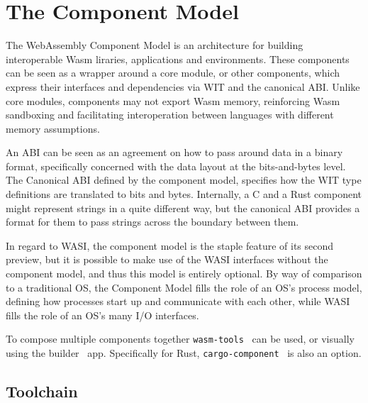 \section{The Component Model}
\label{chap:component_model}


The WebAssembly Component Model is an architecture for building interoperable \gls{Wasm} liraries, applications and environments. These components can be seen as a wrapper around a core module, or other components, which express their interfaces and dependencies via \gls{WIT} and the canonical \gls{ABI}. Unlike core modules, components may not export \gls{Wasm} memory, reinforcing \gls{Wasm} sandboxing and facilitating interoperation between languages with different memory assumptions.

An \gls{ABI} can be seen as an agreement on how to pass around data in a binary format, specifically concerned with the data layout at the bits-and-bytes level. The Canonical \gls{ABI} defined by the component model, specifies how the \gls{WIT} type definitions are translated to bits and bytes. Internally, a C and a Rust component might represent strings in a quite different way, but the canonical \gls{ABI} provides a format for them to pass strings across the boundary between them.

In regard to \gls{WASI}, the component model is the staple feature of its second preview, but it is possible to make use of the \gls{WASI} interfaces without the component model, and thus this model is entirely optional. By way of comparison to a traditional \gls{OS}, the Component Model fills the role of an \gls{OS}'s process model, defining how processes start up and communicate with each other, while \gls{WASI} fills the role of an \gls{OS}'s many I/O interfaces.

To compose multiple components together \texttt{wasm-tools}~\cite{gh:wt} can be used, or visually using the builder~\cite{builder} app. Specifically for Rust, \texttt{cargo-component}~\cite{gh:cc} is also an option.

\subsection{Toolchain}
\label{sec:guest}

